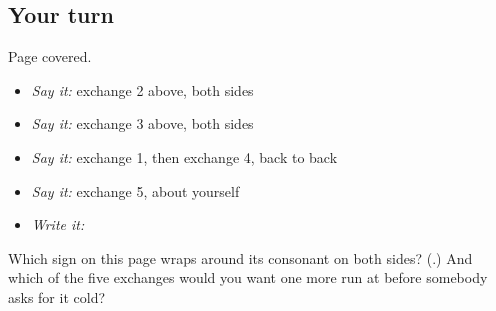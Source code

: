 \subsection*{Your turn}
Page covered.

\begin{itemize}
\raggedright
  \item \emph{Say it:} exchange 2 above, both sides
  \item \emph{Say it:} exchange 3 above, both sides
  \item \emph{Say it:} exchange 1, then exchange 4, back to back
  \item \emph{Say it:} exchange 5, about yourself
  \item \emph{Write it:} \textbf{}
\end{itemize}

\begin{tcolorbox}[breakable,colback=teal!4,colframe=teal!35!black,title={Before you move on}]
Which sign on this page wraps around its consonant on both sides? (\textbf{}.) And which of the five exchanges would you want one more run at before somebody asks for it cold?
\end{tcolorbox}
